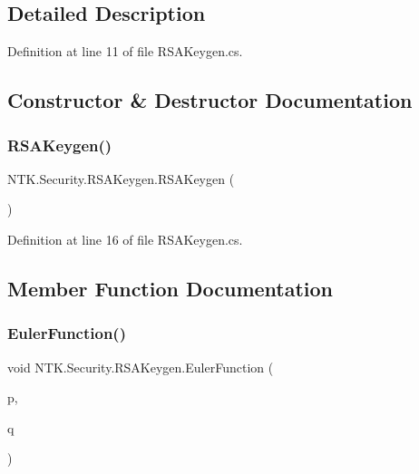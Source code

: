 \subsection{Detailed Description}


Definition at line 11 of file R\+S\+A\+Keygen.\+cs.



\subsection{Constructor \& Destructor Documentation}
\mbox{\label{class_n_t_k_1_1_security_1_1_r_s_a_keygen_a67688d49c8859826c53d0998b8500515}} 
\subsubsection{\texorpdfstring{RSAKeygen()}{RSAKeygen()}}
{\footnotesize\ttfamily N\+T\+K.\+Security.\+R\+S\+A\+Keygen.\+R\+S\+A\+Keygen (\begin{DoxyParamCaption}{ }\end{DoxyParamCaption})}



Definition at line 16 of file R\+S\+A\+Keygen.\+cs.



\subsection{Member Function Documentation}
\mbox{\label{class_n_t_k_1_1_security_1_1_r_s_a_keygen_aed3c282b4d702ec065fbebdee45038c2}} 
\subsubsection{\texorpdfstring{EulerFunction()}{EulerFunction()}}
{\footnotesize\ttfamily void N\+T\+K.\+Security.\+R\+S\+A\+Keygen.\+Euler\+Function (\begin{DoxyParamCaption}\item[{Big\+Integer}]{p,  }\item[{Big\+Integer}]{q }\end{DoxyParamCaption})}



